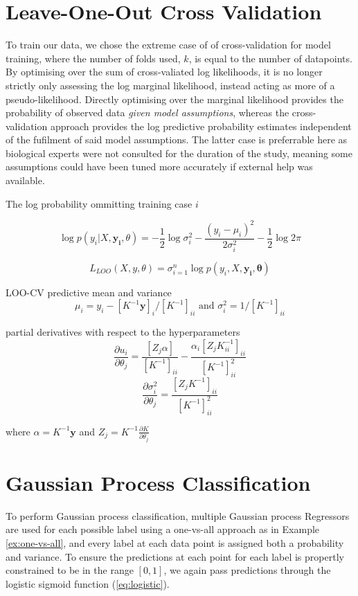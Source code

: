 \section{Leave-One-Out Cross Validation}


To train our data, we chose the extreme case of of cross-validation for model training, where the number of folds used, $k$, is equal to the number of datapoints. By optimising over the sum of cross-valiated log likelihoods, it is no longer strictly only assessing the log marginal likelihood, instead acting as more of a pseudo-likelihood. Directly optimising over the marginal likelihood provides the probability of observed data \textit{given model assumptions}, whereas the cross-validation approach provides the log predictive probability estimates independent of the fufilment of said model assumptions. The latter case is preferrable here as biological experts were not consulted for the duration of the study, meaning some assumptions could have been tuned more accurately if external help was available.

The log probability ommitting training case $i$

$$\log p(y_i|X, \mathbf{y_i}, \theta) = -\frac{1}{2}\log\sigma^2_i - \frac{(y_i - \mu_i)^2}{2 \sigma^2_i} - \frac{1}{2}\log2\pi$$

$$ L_{LOO}(X, y, \theta) = \sigma^n_{i=1} \log p(y_i, X, \mathbf{y_i}, \mathbf{\theta})$$

LOO-CV predictive mean and variance
$$\mu_i= y_i - [K^{-1}\mathbf{y}]_i / [K^{-1}]_{ii} \text{ and } \sigma_i^2 = 1/[K^{-1}]_{ii}$$

partial derivatives with respect to the hyperparameters
$$\frac{\partial{u_i}}{\partial{\theta_j}} = \frac{[Z_j \alpha]}{[K^{-1}]_{ii}} - \frac{\alpha_i[Z_j K^{-1}_{ii}]_{ii}}{[K^{-1}]^2_{ii}}$$
$$\frac{\partial{\sigma_i^2}}{\partial{\theta_j}} = \frac{[Z_jK^{-1}]_{ii}}{[K^{-1}]^2_{ii}}$$

where $\alpha = K^{-1}\mathbf{y}$ and $Z_j = K^{-1} \frac{\partial{K}}{\partial{\theta_j}}$


\section{Gaussian Process Classification} \label{chapsec:gpc}

To perform Gaussian process classification, multiple Gaussian process Regressors are used for each possible label using a one-vs-all approach as in Example \autoref{ex:one-vs-all}, and every label at each data point is assigned both a probability and variance. To ensure the predictions at each point for each label is propertly constrained to be in the range $[0,1]$, we again pass predictions through the logistic sigmoid function (\autoref{eq:logistic}).

